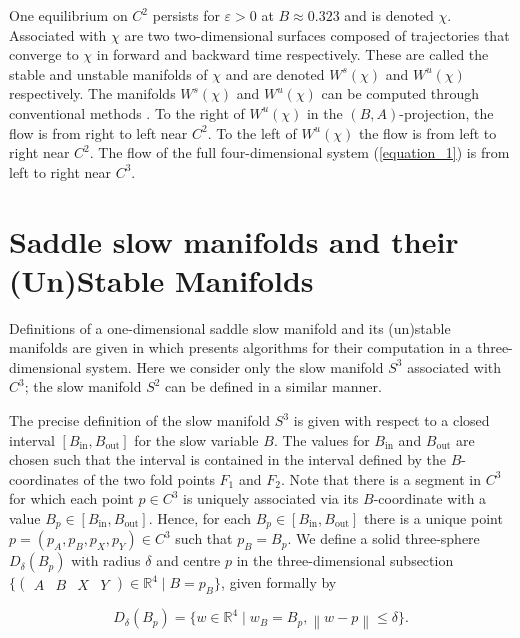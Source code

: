 \documentclass{ws-ijbc}
\begin{document}
One equilibrium on $C^2$ persists for $\varepsilon >0$ at $B \approx 0.323$ and is denoted $\chi$.  Associated with $\chi$ are two two-dimensional surfaces composed of trajectories that converge to $\chi$ in forward and backward time respectively.  These are called the stable and unstable manifolds of $\chi$ and are denoted $W^s(\chi)$ and $W^u(\chi)$ respectively.  The manifolds $W^s(\chi)$ and $W^u(\chi)$ can be computed through conventional methods \cite{Red_book}.  To the right of $W^u(\chi)$ in the $(B,A)$-projection, the flow is from right to left near $C^2$.  To the left of $W^u(\chi)$ the flow is from left to right near $C^2$.  The flow of the full four-dimensional system (\ref{equation_1}) is from left to right near $C^3$.
 
 \section{Saddle slow manifolds and their (Un)Stable Manifolds}
    
Definitions of a one-dimensional saddle slow manifold and its (un)stable manifolds are given in \cite{Saeed_Paper} which presents algorithms for their computation in a three-dimensional system.  Here we consider only the slow manifold $S^3$ associated with $C^3$; the slow manifold $S^2$ can be defined in a similar manner.
    
The precise definition of the slow manifold $S^3$ is given with respect to a closed interval $[B_{\mathrm{in}},B_{\mathrm{out}}]$ for the slow variable $B$.  The values for $B_{\mathrm{in}}$ and $B_{\mathrm{out}}$ are chosen such that the interval is contained in the interval defined by the $B$-coordinates of the two fold points $F_1$ and $F_2$.  Note that there is a segment in $C^3$ for which each point $p \in C^3$ is uniquely associated via its $B$-coordinate with a value $B_p \in [B_{\mathrm{in}},B_{\mathrm{out}}]$.  Hence, for each $B_p \in [B_{\mathrm{in}},B_{\mathrm{out}}]$ there is a unique point $p=(p_A,p_B,p_X,p_Y) \in C^3$ such that $p_B = B_p$.  We define a solid three-sphere $D_\delta(B_p)$ with radius $\delta$ and centre $p$ in the three-dimensional subsection $\{ \begin{pmatrix} A & B & X & Y \end{pmatrix} \in \mathbb{R}^4 \; | \; B=p_B\}$, given formally by

\begin{equation*}
D_\delta(B_p)=\{w \in \mathbb{R}^4 \; | \; w_B = B_p, \left\lVert w-p \right\rVert \leq \delta\}.
\end{equation*}
    
\end{document}

